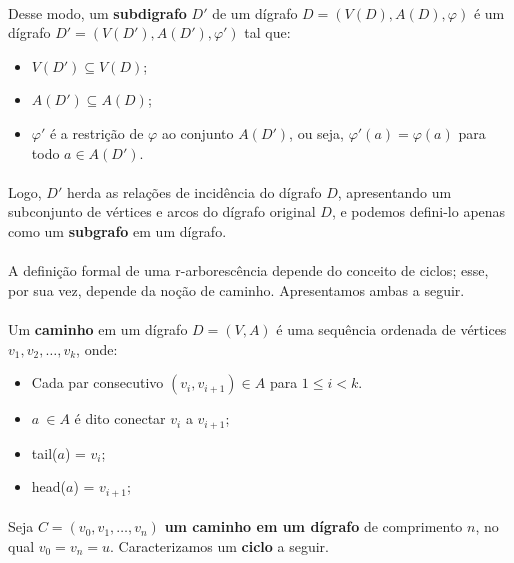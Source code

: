 \documentclass[12pt,a4paper]{article}
\begin{document}
\paragraph{}
Desse modo, um \textbf{subdigrafo} \(D'\) de um dígrafo \(D = (V(D), A(D), \varphi)\) é um dígrafo \(D' = (V(D'), A(D'), \varphi')\) tal que:
\begin{itemize}
    \item \(V(D') \subseteq V(D)\);
    \item \(A(D') \subseteq A(D)\);
    \item \(\varphi'\) é a restrição de \(\varphi\) ao conjunto \(A(D')\), ou seja, \(\varphi'(a) = \varphi(a)\) para todo \(a \in A(D')\).
\end{itemize}

\paragraph{}
Logo, \(D'\) herda as relações de incidência do dígrafo \(D\), apresentando um subconjunto de vértices e arcos do dígrafo original \(D\), e podemos defini-lo apenas como um \textbf{subgrafo} em um dígrafo.

\paragraph{}
A definição formal de uma r-arborescência depende do conceito de ciclos; esse, por sua vez, depende da noção de caminho. Apresentamos ambas a seguir.

\paragraph{}
Um \textbf{caminho} em um dígrafo \(D = (V, A)\) é uma sequência ordenada de vértices \(v_1, v_2, \ldots, v_k\), onde:

\begin{itemize}
\item Cada par consecutivo \((v_i, v_{i+1}) \in A\) para \(1 \leq i < k\). 
\item \(a\ \in A\) é dito conectar \(v_i\) a \(v_{i+1}\);
\item tail(\(a\)) = \(v_i\);
\item head(\(a\)) = \(v_{i+1}\);
\end{itemize}

\paragraph{}
Seja \( C = (v_0, v_1, \ldots, v_n) \) \textbf{um caminho em um dígrafo} de comprimento \( n \), no qual \( v_0 = v_n = u \). Caracterizamos um \textbf{ciclo} a seguir. 
\end{document}

